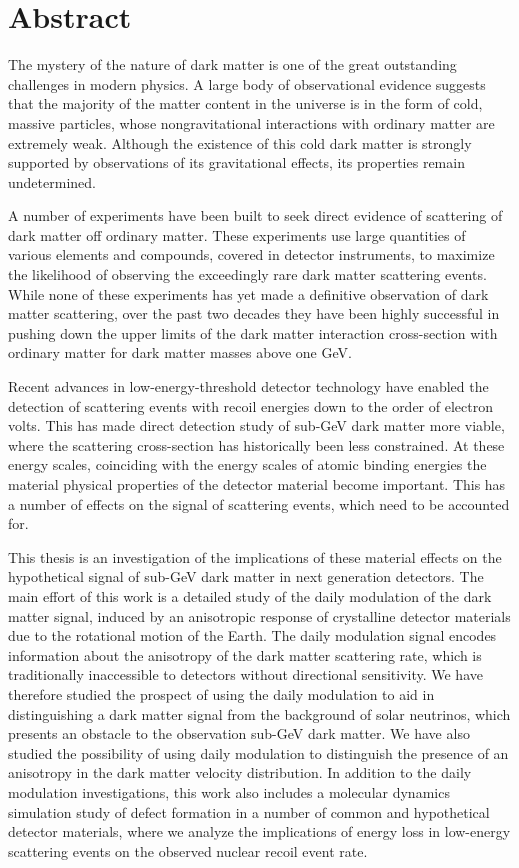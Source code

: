 \documentclass[b5paper, 10pt, twoside]{book}
\begin{document}
\tableofcontents

\chapter{Abstract}

The mystery of the nature of dark matter is one of the great outstanding challenges in modern physics. A large body of observational evidence suggests that the majority of the matter content in the universe is in the form of cold, massive particles, whose nongravitational interactions with ordinary matter are extremely weak. Although the existence of this cold dark matter is strongly supported by observations of its gravitational effects, its properties remain undetermined.

A number of experiments have been built to seek direct evidence of scattering of dark matter off ordinary matter. These experiments use large quantities of various elements and compounds, covered in detector instruments, to maximize the likelihood of observing the exceedingly rare dark matter scattering events. While none of these experiments has yet made a definitive observation of dark matter scattering, over the past two decades they have been highly successful in pushing down the upper limits of the dark matter interaction cross-section with ordinary matter for dark matter masses above one GeV.

Recent advances in low-energy-threshold detector technology have enabled the detection of scattering events with recoil energies down to the order of electron volts. This has made direct detection study of sub-GeV dark matter more viable, where the scattering cross-section has historically been less constrained. At these energy scales, coinciding with the energy scales of atomic binding energies the material physical properties of the detector material become important. This has a number of effects on the signal of scattering events, which need to be accounted for.

This thesis is an investigation of the implications of these material effects on the hypothetical signal of sub-GeV dark matter in next generation detectors. The main effort of this work is a detailed study of the daily modulation of the dark matter signal, induced by an anisotropic response of crystalline detector materials due to the rotational motion of the Earth. The daily modulation signal encodes information about the anisotropy of the dark matter scattering rate, which is traditionally inaccessible to detectors without directional sensitivity. We have therefore studied the prospect of using the daily modulation to aid in distinguishing a dark matter signal from the background of solar neutrinos, which presents an obstacle to the observation sub-GeV dark matter. We have also studied the possibility of using daily modulation to distinguish the presence of an anisotropy in the dark matter velocity distribution. In addition to the daily modulation investigations, this work also includes a molecular dynamics simulation study of defect formation in a number of common and hypothetical detector materials, where we analyze the implications of energy loss in low-energy scattering events on the observed nuclear recoil event rate.
\end{document}
